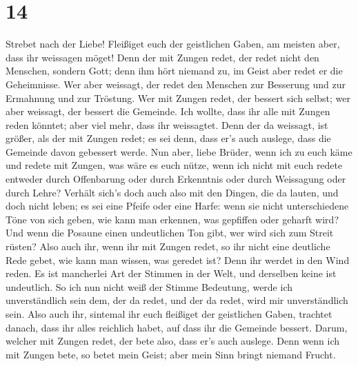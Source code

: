 \hypertarget{section-13}{%
\section{14}\label{section-13}}

 Strebet nach der Liebe! Fleißiget euch der geistlichen
Gaben, am meisten aber, dass ihr weissagen möget!  Denn
der mit Zungen redet, der redet nicht den Menschen, sondern Gott; denn
ihm hört niemand zu, im Geist aber redet er die Geheimnisse.
 Wer aber weissagt, der redet den Menschen zur Besserung
und zur Ermahnung und zur Tröstung.  Wer mit Zungen redet,
der bessert sich selbst; wer aber weissagt, der bessert die Gemeinde.
 Ich wollte, dass ihr alle mit Zungen reden könntet; aber
viel mehr, dass ihr weissagtet. Denn der da weissagt, ist größer, als
der mit Zungen redet; es sei denn, dass er's auch auslege, dass die
Gemeinde davon gebessert werde.  Nun aber, liebe Brüder,
wenn ich zu euch käme und redete mit Zungen, was wäre es euch nütze,
wenn ich nicht mit euch redete entweder durch Offenbarung oder durch
Erkenntnis oder durch Weissagung oder durch Lehre? 
Verhält sich's doch auch also mit den Dingen, die da lauten, und doch
nicht leben; es sei eine Pfeife oder eine Harfe: wenn sie nicht
unterschiedene Töne von sich geben, wie kann man erkennen, was gepfiffen
oder geharft wird?  Und wenn die Posaune einen
undeutlichen Ton gibt, wer wird sich zum Streit rüsten? 
Also auch ihr, wenn ihr mit Zungen redet, so ihr nicht eine deutliche
Rede gebet, wie kann man wissen, was geredet ist? Denn ihr werdet in den
Wind reden.  Es ist mancherlei Art der Stimmen in der
Welt, und derselben keine ist undeutlich.  So ich nun
nicht weiß der Stimme Bedeutung, werde ich unverständlich sein dem, der
da redet, und der da redet, wird mir unverständlich sein.
 Also auch ihr, sintemal ihr euch fleißiget der
geistlichen Gaben, trachtet danach, dass ihr alles reichlich habet, auf
dass ihr die Gemeinde bessert.  Darum, welcher mit Zungen
redet, der bete also, dass er's auch auslege.  Denn wenn
ich mit Zungen bete, so betet mein Geist; aber mein Sinn bringt niemand
Frucht.


